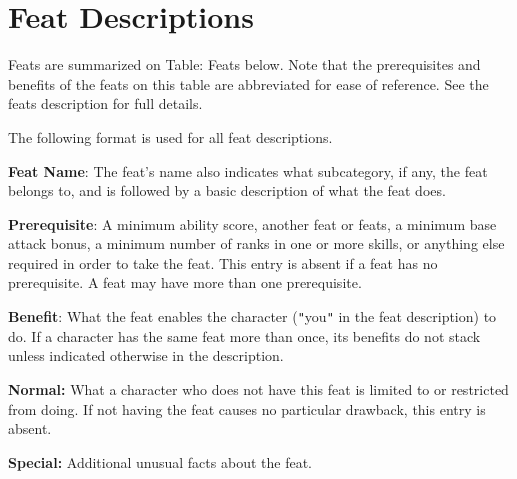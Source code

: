 \section{Feat Descriptions}

				
Feats are summarized on Table: Feats below. Note that the prerequisites and benefits of the feats on this table are abbreviated for ease of reference. See the feats description for full details.
				
The following format is used for all feat descriptions.
				
\textbf{Feat Name}: The feat's name also indicates what subcategory, if any, the feat belongs to, and is followed by a basic description of what the feat does.
				
\textbf{Prerequisite}: A minimum ability score, another feat or feats, a minimum base attack bonus, a minimum number of ranks in one or more skills, or anything else required in order to take the feat. This entry is absent if a feat has no prerequisite. A feat may have more than one prerequisite.
				
\textbf{Benefit}: What the feat enables the character (\texttt{{}"{}}you\texttt{{}"{}} in the feat description) to do. If a character has the same feat more than once, its benefits do not stack unless indicated otherwise in the description.
				
\textbf{Normal:} What a character who does not have this feat is limited to or restricted from doing. If not having the feat causes no particular drawback, this entry is absent.
				
\textbf{Special:} Additional unusual facts about the feat.

